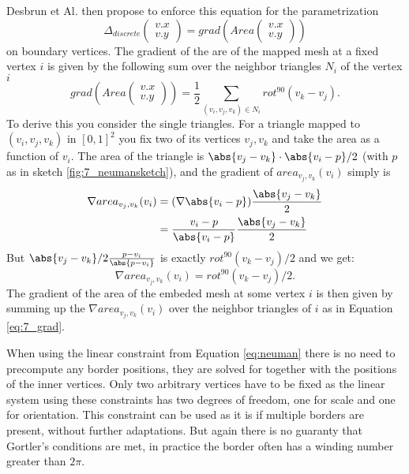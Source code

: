Desbrun et Al. then propose to enforce this equation for the parametrization
\begin{equation}
\Delta_{discrete}\begin{pmatrix}v.x\\v.y\end{pmatrix} = grad(Area\begin{pmatrix}v.x\\v.y\end{pmatrix})
\label{eq:neuman}
\end{equation}
on boundary vertices. The gradient of the are of the mapped mesh at a fixed vertex $i$ is given by the following sum over the neighbor triangles $N_i$ of the vertex $i$
\begin{equation}grad(Area\begin{pmatrix}v.x\\v.y\end{pmatrix}) = \frac{1}{2}\sum_{(v_i,v_j,v_k)\in N_{i}}rot^{90}(v_k-v_j).\label{eq:7_grad}\end{equation}
To derive this you consider the single triangles. For a triangle mapped to $(v_i,v_j,v_k)$ in $[0,1]^2$  you fix two of its vertices $v_j, v_k$ and take the area as a function of $v_i$.
The area of the triangle is $\abs{v_j-v_k}\cdot\abs{v_i-p}/2$ (with $p$ as in sketch \ref{fig:7_neumansketch}), and the gradient of $area_{v_j,v_k}(v_i)$ simply is
\begin{align*}\nabla area_{v_j,v_k}(v_i) &=  (\nabla \abs{v_i-p})\frac{\abs{v_j-v_k}}{2}\\
&=  \frac{v_i-p}{\abs{v_i-p}}\frac{\abs{v_j-v_k}}{2}\end{align*}
But  $\abs{v_j-v_k}/2 \frac{p-v_i}{\abs{p-v_i}}$ is exactly $rot^{90}(v_k-v_j)/2$ and we get:
\[ \nabla area_{v_j,v_k}(v_i) = rot^{90}(v_k-v_j)/2.\]
The gradient of the area of the embeded mesh at some vertex $i$ is then given by summing up the $\nabla area_{v_j,v_k}(v_i)$ over the neighbor triangles of $i$ as in Equation \ref{eq:7_grad}.

When using the linear constraint from Equation \ref{eq:neuman} there is no need to precompute any border positions, they are solved for together with the positions of the inner vertices. Only two arbitrary vertices have to be fixed as the linear system using these constraints has two degrees of freedom, one for scale and one for orientation. This constraint can be used as it is if multiple borders are present, without further adaptations. But again there is no guaranty that Gortler's conditions are met, in practice the border often has a winding number greater than $2\pi$.
